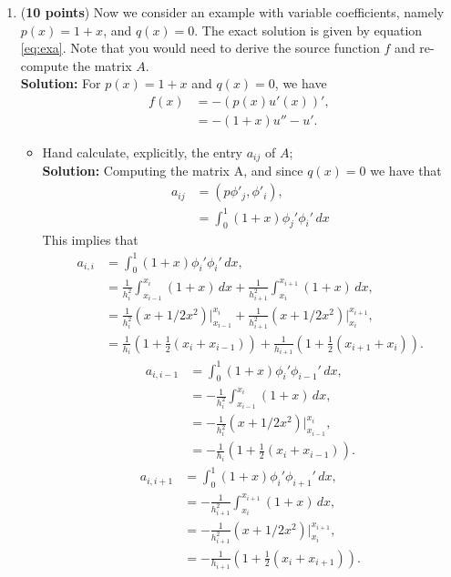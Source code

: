\documentclass[11pt]{article}      %
\begin{document}
\begin{enumerate}
\begin{enumerate}
\item ({\bf 10 points}) 
Now we consider an example with variable coefficients, namely $p(x)=1+x$, and $q(x)=0$. The exact solution is given by  equation \eqref{eq:exa}. Note that you would need to derive the source function $f$ and re-compute the matrix $A$.\\
{\bf Solution: } For $p(x) = 1+x$ and $q(x) = 0$, we have 
\begin{align*}
	f(x) &= -(p(x)u'(x))', \\
	&=-(1+x)u'' - u'.
\end{align*}
\begin{itemize}
\item[(c.1)] Hand calculate, explicitly, the entry  $a_{ij}$ of $A$;\\
{\bf Solution:}
Computing the matrix A, and since $q(x)=0$ we have that
\begin{align}
	a_{ij} &= (p\phi'_j,\phi'_i),\\
	&=\int_{0}^{1} (1+x)\phi_j'\phi_i' \, dx
\end{align}
This implies that 
\begin{align*}
	a_{i,i} &= \int_{0}^{1} (1+x)\phi_i'\phi_i' \, dx,\\
	&=\frac{1}{h^2_i}\int_{x_{i-1}}^{x_i}(1+x)\, dx + \frac{1}{h^2_{i+1}}\int_{x_{i}}^{x_{i+1}}(1+x)\, dx,\\
	&=\frac{1}{h^2_i}(x+1/2x^2)\bigg|_{x_{i-1}}^{x_{i}} + \frac{1}{h^2_{i+1}}(x+1/2x^2)\bigg|_{x_{i}}^{x_{i+1}},\\
	&=\frac{1}{h_{i}}(1+\frac{1}{2}(x_{i}+x_{i-1})) + \frac{1}{h_{i+1}}(1+\frac{1}{2}(x_{i+1}+x_{i})).
\end{align*}
\begin{align*}
	a_{i,i-1} &= \int_{0}^{1} (1+x)\phi_i'\phi_{i-1}' \, dx,\\
	&=-\frac{1}{h^2_i}\int_{x_{i-1}}^{x_i}(1+x)\, dx,\\
	&=-\frac{1}{h^2_i}(x+1/2x^2)\bigg|_{x_{i-1}}^{x_{i}},\\
	&=-\frac{1}{h_{i}}(1+\frac{1}{2}(x_{i}+x_{i-1})).
\end{align*}
\begin{align*}
	a_{i,i+1} &= \int_{0}^{1} (1+x)\phi_i'\phi_{i+1}' \, dx,\\
	&=-\frac{1}{h^2_{i+1}}\int_{x_{i}}^{x_{i+1}}(1+x)\, dx,\\
	&=-\frac{1}{h^2_{i+1}}(x+1/2x^2)\bigg|_{x_{i}}^{x_{i+1}},\\
	&=-\frac{1}{h_{i+1}}(1+\frac{1}{2}(x_{i}+x_{i+1})).
\end{align*}

\end{itemize}
\end{enumerate}
\end{enumerate}
\end{document}
